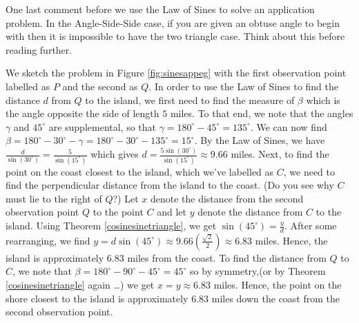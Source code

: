 \medskip


One last comment before we use the Law of Sines to solve an application problem.  In the Angle-Side-Side case, if you are given an obtuse angle to begin with then it is impossible to have the two triangle case.  Think about this before reading further.

\medskip

{ We sketch the problem in Figure \ref{fig:sinesappeg} with the first observation point labelled as $P$ and the second as $Q$. In order to use the Law of Sines to find the distance $d$ from $Q$ to the island, we first need to find the measure of $\beta$ which is the angle opposite the side of length $5$ miles.  To that end, we note that the angles $\gamma$ and $45^{\circ}$ are supplemental, so that $\gamma = 180^{\circ} - 45^{\circ} = 135^{\circ}$.  We can now find $\beta = 180^{\circ} - 30^{\circ} - \gamma =  180^{\circ} - 30^{\circ} - 135^{\circ} = 15^{\circ}$. By the Law of Sines, we have $\frac{d}{\sin\left(30^{\circ}\right)} = \frac{5}{\sin\left(15^{\circ}\right)}$ which gives $d = \frac{5\sin\left(30^{\circ}\right)}{\sin\left(15^{\circ}\right)} \approx 9.66$ miles.  Next, to find the point on the coast closest to the island, which we've labelled as $C$, we need to find the perpendicular distance from the island to the coast. (Do you see why $C$ must lie to the right of $Q$?) Let $x$ denote the distance from the second observation point $Q$ to the point $C$  and let $y$ denote the distance from $C$ to the island.  Using Theorem \ref{cosinesinetriangle}, we get $\sin\left(45^{\circ}\right) = \frac{y}{d}$.  After some rearranging, we find $y = d \sin\left(45^{\circ}\right) \approx 9.66 \left(\frac{\sqrt{2}}{2}\right) \approx 6.83$ miles.  Hence, the island is approximately $6.83$ miles from the coast. To find the distance from $Q$ to $C$, we note that $\beta = 180^{\circ} - 90^{\circ} - 45^{\circ} = 45^{\circ}$ so by symmetry,(or by Theorem \ref{cosinesinetriangle} again \ldots) we get $x = y \approx 6.83$ miles.  Hence, the point on the shore closest to the island is approximately $6.83$ miles down the coast from the second observation point.
}

